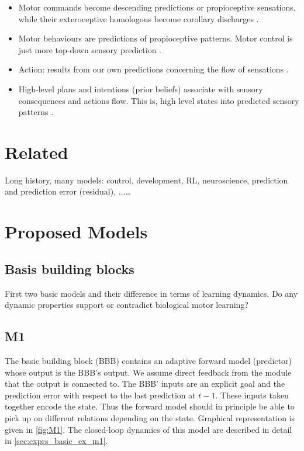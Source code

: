 \documentclass[11pt]{llncs}
\begin{document}
\begin{itemize}
\item Motor commands become descending predictions or propioceptive
  sensations, while their exteroceptive homologous become corollary
  discharges \citep{friston2011}.

\item Motor behaviours are predictions of propioceptive
  patterns. Motor control is just more top-down sensory prediction
  \citep{clark2015}. 

\item Action: results from our own predictions concerning the flow of
  sensations \citep{pickering2014}. 

\item High-level plans and intentions (prior beliefs) associate with
  sensory consequences and actions flow. This is, high level states
  into predicted sensory patterns \citep{pickering2014}.

\end{itemize}

\section{Related}
\label{sec:orgf9aed21}

Long history, many models: control, development, RL, neuroscience, prediction and prediction error (residual), ...\ldots{}

\section{Proposed Models}
\label{plan}

\subsection{Basis building blocks}

First two basic models and their difference in terms of learning
dynamics. Do any dynamic properties support or contradict biological
motor learning?

\subsection{M1}

The basic building block (BBB) contains an adaptive forward model
(predictor) whose output is the BBB's output. We assume direct
feedback from the module that the output is connected to. The BBB'
inputs are an explicit goal and the prediction error with respect to
the last prediction at ${t-1}$. These inputs taken together encode the
state. Thus the forward model should in principle be able to pick up
on different relations depending on the state. Graphical
representation is given in \autoref{fig:M1}. The closed-loop dynamics
of this model are described in detail in \autoref{sec:exprs_basic_ex_m1}.
\end{document}

